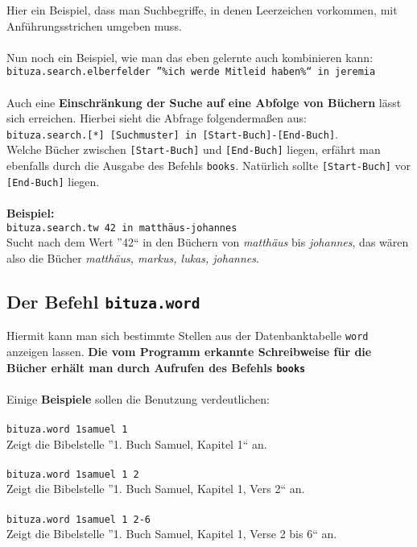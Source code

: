 \documentclass[a4paper]{scrartcl}
\begin{document}
Hier ein Beispiel, dass man Suchbegriffe, in denen Leerzeichen vorkommen, mit Anführungsstrichen umgeben muss.
\\\\
Nun noch ein Beispiel, wie man das eben gelernte auch kombinieren kann:\\
\texttt{bituza.search.elberfelder ''\%ich werde Mitleid haben\%`` in jeremia}\\
\\
Auch eine \textbf{Einschränkung der Suche auf eine Abfolge von Büchern} lässt sich erreichen. Hierbei sieht die Abfrage folgendermaßen aus:\\
\texttt{bituza.search.[*] [Suchmuster] in [Start-Buch]-[End-Buch]}.\\
Welche Bücher zwischen \texttt{[Start-Buch]} und \texttt{[End-Buch]} liegen, erfährt man ebenfalls durch die Ausgabe des Befehls \texttt{books}. Natürlich sollte \texttt{[Start-Buch]} vor \texttt{[End-Buch]} liegen.\\
\\
\textbf{Beispiel:}\\
\texttt{bituza.search.tw 42 in matthäus-johannes}\\
Sucht nach dem Wert ''42`` in den Büchern von \textit{matthäus} bis \textit{johannes}, das wären also die Bücher \textit{matthäus, markus, lukas, johannes}.

\subsection{Der Befehl \texttt{bituza.word}}

Hiermit kann man sich bestimmte Stellen aus der Datenbanktabelle \texttt{word} anzeigen lassen. \textbf{Die vom Programm erkannte Schreibweise für die Bücher erhält man durch Aufrufen des Befehls \texttt{books}}
\\\\
Einige \textbf{Beispiele} sollen die Benutzung verdeutlichen:\\
\\
\texttt{bituza.word 1samuel 1}\\
Zeigt die Bibelstelle ''1. Buch Samuel, Kapitel 1`` an.\\
\\
\texttt{bituza.word 1samuel 1 2}\\
Zeigt die Bibelstelle ''1. Buch Samuel, Kapitel 1, Vers 2`` an.\\
\\
\texttt{bituza.word 1samuel 1 2-6}\\
Zeigt die Bibelstelle ''1. Buch Samuel, Kapitel 1, Verse 2 bis 6`` an.\\
\end{document}
